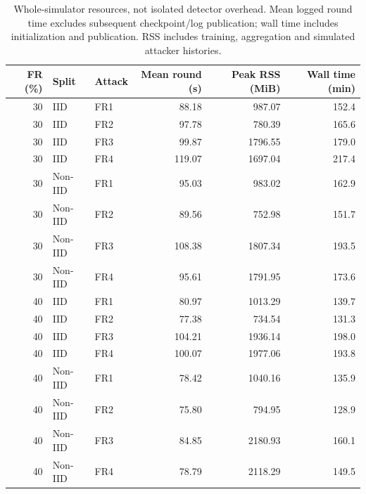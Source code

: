 \begin{table}[t]
\centering\footnotesize\setlength{\tabcolsep}{4pt}
\caption{Whole-simulator resources, not isolated detector overhead. Mean logged round time excludes subsequent checkpoint/log publication; wall time includes initialization and publication. RSS includes training, aggregation and simulated attacker histories.}\label{tab:resources}
\begin{tabular}{rllrrr}
\toprule
FR (\%) & Split & Attack & Mean round (s) & Peak RSS (MiB) & Wall time (min) \\
\midrule
30 & IID & FR1 & 88.18 & 987.07 & 152.4 \\
30 & IID & FR2 & 97.78 & 780.39 & 165.6 \\
30 & IID & FR3 & 99.87 & 1796.55 & 179.0 \\
30 & IID & FR4 & 119.07 & 1697.04 & 217.4 \\
30 & Non-IID & FR1 & 95.03 & 983.02 & 162.9 \\
30 & Non-IID & FR2 & 89.56 & 752.98 & 151.7 \\
30 & Non-IID & FR3 & 108.38 & 1807.34 & 193.5 \\
30 & Non-IID & FR4 & 95.61 & 1791.95 & 173.6 \\
40 & IID & FR1 & 80.97 & 1013.29 & 139.7 \\
40 & IID & FR2 & 77.38 & 734.54 & 131.3 \\
40 & IID & FR3 & 104.21 & 1936.14 & 198.0 \\
40 & IID & FR4 & 100.07 & 1977.06 & 193.8 \\
40 & Non-IID & FR1 & 78.42 & 1040.16 & 135.9 \\
40 & Non-IID & FR2 & 75.80 & 794.95 & 128.9 \\
40 & Non-IID & FR3 & 84.85 & 2180.93 & 160.1 \\
40 & Non-IID & FR4 & 78.79 & 2118.29 & 149.5 \\
\bottomrule
\end{tabular}
\end{table}
